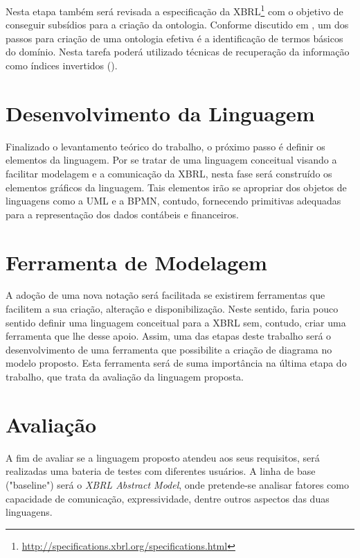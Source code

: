 \documentclass[msc,proposal,hidelot,hideabstract]{ppgccufmg} %
\begin{document}
Nesta etapa também será revisada a especificação da XBRL\footnote{\url{http://specifications.xbrl.org/specifications.html}} com o objetivo de conseguir subsídios para a criação da ontologia. Conforme discutido em \cite{lupacsc2010role}{}, um dos passos para criação de uma ontologia efetiva é a identificação de termos básicos do domínio. Nesta tarefa poderá utilizado técnicas de recuperação da informação como índices invertidos (\cite{baeza1999modern}).

\section{Desenvolvimento da Linguagem}
\label{sec:dese_lingugem}

Finalizado o levantamento teórico do trabalho, o próximo passo é definir os elementos da linguagem. Por se tratar de uma linguagem conceitual visando a facilitar modelagem e a comunicação da XBRL, nesta fase será construído os elementos gráficos da linguagem. Tais elementos irão se apropriar dos objetos de linguagens como a UML e a BPMN, contudo, fornecendo primitivas adequadas para a representação dos dados contábeis e financeiros.

\section{Ferramenta de Modelagem}
\label{sec:ferramenta}

A adoção de uma nova notação será facilitada se existirem ferramentas que facilitem a sua criação, alteração e disponibilização. Neste sentido, faria pouco sentido definir uma linguagem conceitual para a XBRL sem, contudo, criar uma ferramenta que lhe desse apoio. Assim, uma das etapas deste trabalho será o desenvolvimento de uma ferramenta que possibilite a criação de diagrama no modelo proposto. Esta ferramenta será de suma importância na última etapa do trabalho, que trata da avaliação da linguagem proposta.

\section{Avaliação}
\label{sec:avaliacao}

A fim de avaliar se a linguagem proposto atendeu aos seus requisitos, será realizadas uma bateria de testes com diferentes usuários. A linha de base ("baseline") será o \textit{XBRL Abstract Model}, onde pretende-se analisar fatores como capacidade de comunicação, expressividade, dentre outros aspectos das duas linguagens.
\end{document}
